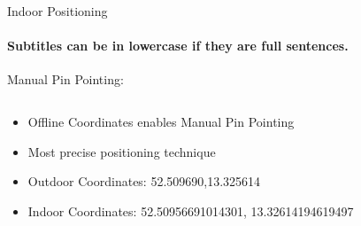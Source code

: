 \documentclass[11pt]{beamer}
\begin{document}
\begin{frame}{Indoor Positioning}

\framesubtitle{Subtitles can be in lowercase if they are full sentences.}
Manual Pin Pointing:

  \begin{columns}[T]
  \begin{column}{.6\textwidth}
  \begin{itemize}
 \item Offline Coordinates enables Manual Pin Pointing
 \item Most precise positioning technique
 \item Outdoor Coordinates: 52.509690,13.325614
 \item Indoor Coordinates: 52.50956691014301, 13.32614194619497

  \end{itemize}
  \end{column}
  \begin{column}{.4\textwidth}

\end{column}
\end{columns}
\end{frame}
\end{document}
